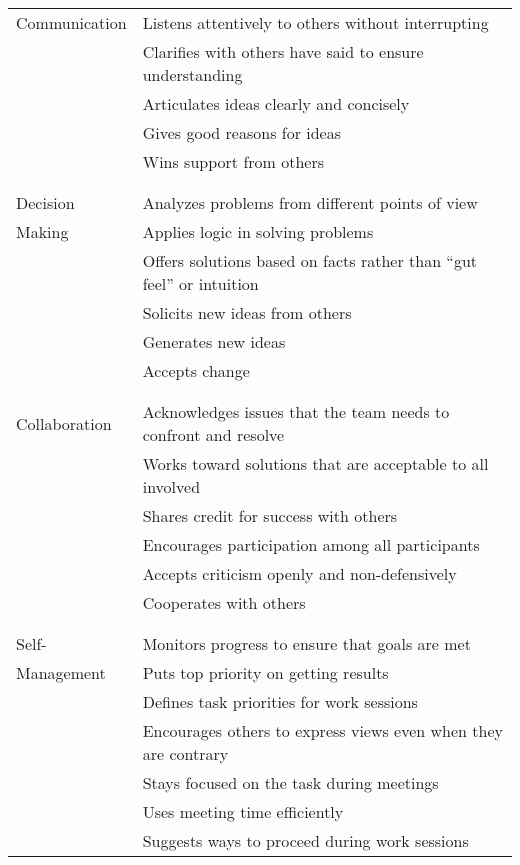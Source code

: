 \noindent
\begin{longtable}{p{}p{}}

  Communication
  & Listens attentively to others without interrupting \\
  & Clarifies with others have said to ensure understanding \\
  & Articulates ideas clearly and concisely \\
  & Gives good reasons for ideas \\
  & Wins support from others \\
  \\ [-1.5ex] \hline \\ [-1.5ex]

  Decision
  & Analyzes problems from different points of view \\
  Making
  & Applies logic in solving problems \\
  & Offers solutions based on facts rather than ``gut feel'' or intuition \\
  & Solicits new ideas from others \\
  & Generates new ideas \\
  & Accepts change \\
  \\ [-1.5ex] \hline \\ [-1.5ex]

  Collaboration
  & Acknowledges issues that the team needs to confront and resolve \\
  & Works toward solutions that are acceptable to all involved \\
  & Shares credit for success with others \\
  & Encourages participation among all participants \\
  & Accepts criticism openly and non-defensively \\
  & Cooperates with others \\
  \\ [-1.5ex] \hline \\ [-1.5ex]

  Self-
  & Monitors progress to ensure that goals are met \\
  Management
  & Puts top priority on getting results \\
  & Defines task priorities for work sessions \\
  & Encourages others to express views even when they are contrary \\
  & Stays focused on the task during meetings \\
  & Uses meeting time efficiently \\
  & Suggests ways to proceed during work sessions \\

\end{longtable}


